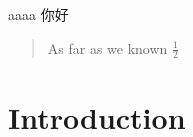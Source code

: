 \documentclass[]{article}
\title{}
\author{}
\begin{document}
aaaa
你好

\begin{abstract}
As far as we known
$\frac{1}{2}$

\end{abstract}

\section{Introduction}
\end{document}
